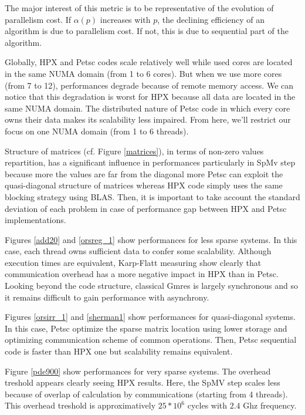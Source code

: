 \documentclass[smallextended]{svjour3}
\begin{document}
The major interest of this metric is to be representative of the evolution of parallelism cost. If $\alpha(p)$ increases with $p$, the declining efficiency of an algorithm is due to parallelism cost. If not, this is due to sequential part of the algorithm.\smallskip

Globally, HPX and Petsc codes scale relatively well while used cores are located in the same NUMA domain (from 1 to 6 cores). But when we use more cores (from 7 to 12), performances degrade because of remote memory access. We can notice that this degradation is worst for HPX because all data are located in the same NUMA domain. The distributed nature of Petsc code in which every core owns their data makes its scalability less impaired. From here, we'll restrict our focus on one NUMA domain (from 1 to 6 threads).\smallskip

Structure of matrices (cf. Figure \ref{matrices}), in terms of non-zero values repartition, has a significant influence in performances particularly in SpMv step because more the values are far from the diagonal more Petsc can exploit the quasi-diagonal structure of matrices whereas HPX code simply uses the same blocking strategy using BLAS. Then, it is important to take account the standard deviation of each problem in case of performance gap between HPX and Petsc implementations.\smallskip     

Figures \ref{add20} and \ref{orsreg_1} show performances for less sparse systems. In this case, each thread owns sufficient data to confer some scalability. Although execution times are equivalent, Karp-Flatt measuring show clearly that communication overhead has a more negative impact in HPX than in Petsc. Looking beyond the code structure, classical Gmres is largely synchronous and so it remains difficult to gain performance with asynchrony.\smallskip

Figures \ref{orsirr_1} and \ref{sherman1} show performances for quasi-diagonal systems. In this case, Petsc optimize the sparse matrix location using lower storage and optimizing communication scheme of common operations. Then, Petsc sequential code is faster than HPX one but scalability remains equivalent.\smallskip

Figure \ref{pde900} show performances for very sparse systems. The overhead treshold appears clearly seeing HPX results. Here, the SpMV step scales less because of overlap of calculation by communications (starting from 4 threads). This overhead treshold is approximatively $25*10^{6}$ cycles with $2.4$ Ghz frequency.
\end{document}
